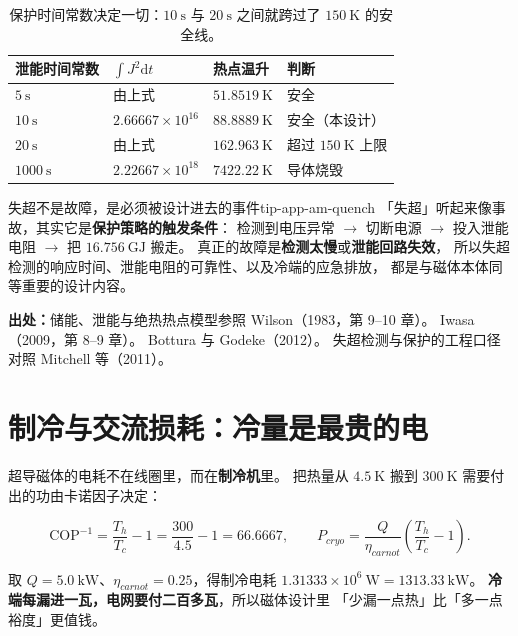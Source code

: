 \begin{table}[htbp]
\centering
\small
\caption{保护时间常数决定一切：$10\ \mathrm{s}$ 与 $20\ \mathrm{s}$ 之间就跨过了 $150\ \mathrm{K}$ 的安全线。}
\label{tab:app-am-quench}
\begin{tabular}{p{3.2cm}p{4.0cm}p{3.2cm}p{3.3cm}}
\toprule
泄能时间常数 & $\int J^{2}\mathrm{d}t$ & 热点温升 & 判断 \\
\midrule
$5\ \mathrm{s}$ & 由上式 & $51.8519\ \mathrm{K}$ & 安全 \\
$10\ \mathrm{s}$ & $2.66667\times10^{16}$ & $88.8889\ \mathrm{K}$ & 安全（本设计） \\
$20\ \mathrm{s}$ & 由上式 & $162.963\ \mathrm{K}$ & 超过 $150\ \mathrm{K}$ 上限 \\
$1000\ \mathrm{s}$ & $2.22667\times10^{18}$ & $7422.22\ \mathrm{K}$ & 导体烧毁 \\
\bottomrule
\end{tabular}

\end{table}

\begin{tip}{失超不是故障，是必须被设计进去的事件}{tip-app-am-quench}
「失超」听起来像事故，其实它是\textbf{保护策略的触发条件}：
检测到电压异常 $\to$ 切断电源 $\to$ 投入泄能电阻 $\to$ 把 $16.756\ \mathrm{GJ}$ 搬走。
真正的故障是\textbf{检测太慢}或\textbf{泄能回路失效}，
所以失超检测的响应时间、泄能电阻的可靠性、以及冷端的应急排放，
都是与磁体本体同等重要的设计内容。
\end{tip}

{\footnotesize
\textbf{出处：}储能、泄能与绝热热点模型参照 Wilson（1983，第 9--10 章）。
Iwasa（2009，第 8--9 章）。
Bottura 与 Godeke（2012）。
失超检测与保护的工程口径对照 Mitchell 等（2011）。
}

\section{制冷与交流损耗：冷量是最贵的电}
\label{sec:app-am-cryo}

超导磁体的电耗不在线圈里，而在\textbf{制冷机}里。
把热量从 $4.5\ \mathrm{K}$ 搬到 $300\ \mathrm{K}$ 需要付出的功由卡诺因子决定：

\begin{equation}
\mathrm{COP}^{-1}=\frac{T_{h}}{T_{c}}-1=\frac{300}{4.5}-1=66.6667,
\qquad
P_{cryo}=\frac{Q}{\eta_{carnot}}\left(\frac{T_{h}}{T_{c}}-1\right).
\label{eq:app-am-cop}
\end{equation}

取 $Q=5.0\ \mathrm{kW}$、$\eta_{carnot}=0.25$，得制冷电耗 $1.31333\times10^{6}\ \mathrm{W}=1313.33\ \mathrm{kW}$。
\textbf{冷端每漏进一瓦，电网要付二百多瓦}，所以磁体设计里
「少漏一点热」比「多一点裕度」更值钱。

